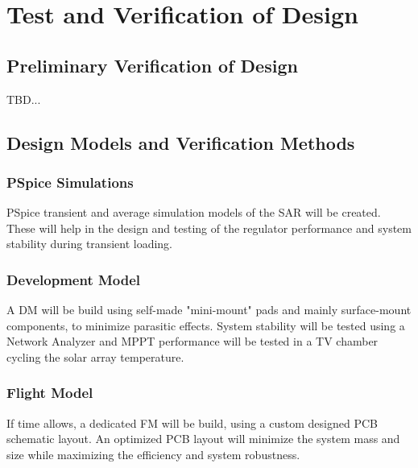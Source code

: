\section{Test and Verification of Design}
\label{sec:test_verification}

\subsection{Preliminary Verification of Design}

TBD...

\subsection{Design Models and Verification Methods}

\subsubsection*{PSpice Simulations}
PSpice transient and average simulation models of the \ac{SAR} will be created. These will help in the design and testing of the regulator performance and system stability during transient loading.

\subsubsection*{Development Model}
A \ac{DM} will be build using self-made "mini-mount" pads and mainly surface-mount components, to minimize parasitic effects. System stability will be tested using a Network Analyzer and MPPT performance will be tested in a \ac{TV} chamber cycling the solar array temperature.

\subsubsection*{Flight Model}
If time allows, a dedicated \ac{FM} will be build, using a custom designed \ac{PCB} schematic layout. An optimized \ac{PCB} layout will minimize the system mass and size while maximizing the efficiency and system robustness.